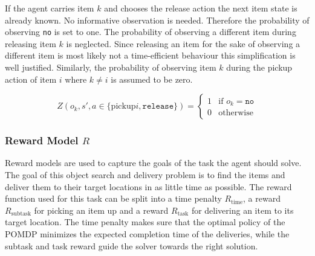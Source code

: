 If the agent carries item $k$ and chooses the release action the next item state is already known. No informative observation is needed. Therefore the probability of observing \texttt{no} is set to one. The probability of observing a different item during releasing item $k$ is neglected. Since releasing an item for the sake of observing a different item is most likely not a time-efficient behaviour this simplification is well justified. Similarly, the probability of observing item $k$ during the pickup action of item $i$ where $k\neq i$ is assumed to be zero. 

\begin{equation}\label{eq:Orelease}
    Z(o_k, s', a\in\{\text{pickup}i, \texttt{release}\}) = \begin{cases}
    1& \text{if } o_k=\texttt{no}\\
    0& \text{otherwise}\end{cases}
\end{equation}


\subsubsection{Reward Model $R$}
Reward models are used to capture the goals of the task the agent should solve. The goal of this object search and delivery problem is to find the items and deliver them to their target locations in as little time as possible. The reward function used for this task can be split into a time penalty $R_\text{time}$, a reward  $R_\text{subtask}$ for picking an item up and a reward $R_\text{task}$ for delivering an item to its target location. The time penalty makes sure that the optimal policy of the POMDP minimizes the expected completion time of the deliveries, while the subtask and task reward guide the solver towards the right solution. 

